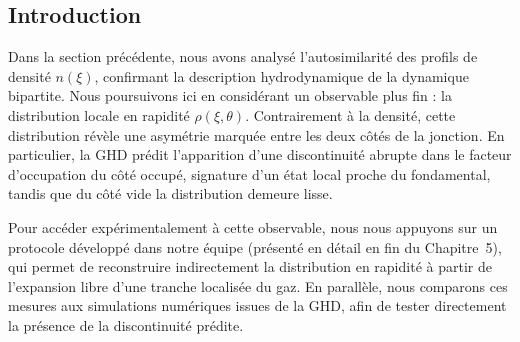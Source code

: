 \subsection*{Introduction}

Dans la section précédente, nous avons analysé l’autosimilarité des profils de densité $n(\xi)$, confirmant la description hydrodynamique de la dynamique bipartite. Nous poursuivons ici en considérant un observable plus fin : la distribution locale en rapidité $\rho(\xi,\theta)$. Contrairement à la densité, cette distribution révèle une asymétrie marquée entre les deux côtés de la jonction. En particulier, la GHD prédit l’apparition d’une discontinuité abrupte dans le facteur d’occupation du côté occupé, signature d’un état local proche du fondamental, tandis que du côté vide la distribution demeure lisse.

\medskip

Pour accéder expérimentalement à cette observable, nous nous appuyons sur un protocole développé dans notre équipe \cite{dubois_probing_2024} (présenté en détail en fin du Chapitre~5), qui permet de reconstruire indirectement la distribution en rapidité à partir de l’expansion libre d’une tranche localisée du gaz. En parallèle, nous comparons ces mesures aux simulations numériques issues de la GHD, afin de tester directement la présence de la discontinuité prédite.



